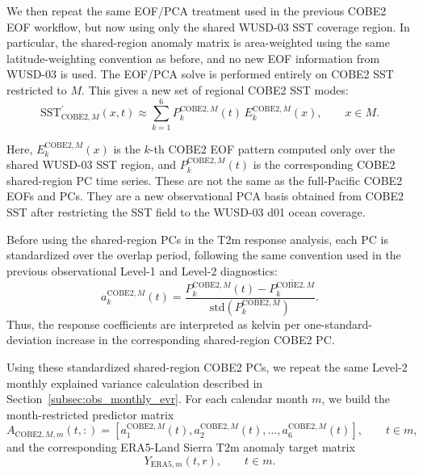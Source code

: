 \documentclass[11pt]{article}
\newcommand{\sst}{\mathrm{SST}}
\begin{document}
We then repeat the same EOF/PCA treatment used in the previous COBE2 EOF workflow, but now using
only the shared WUSD-03 SST coverage region. In particular, the shared-region anomaly matrix is
area-weighted using the same latitude-weighting convention as before, and no new EOF information
from WUSD-03 is used. The EOF/PCA solve is performed entirely on COBE2 SST restricted to $M$. This
gives a new set of regional COBE2 SST modes:
\begin{equation}
\sst_{\mathrm{COBE2},M}^{\prime}(x,t)
\approx
\sum_{k=1}^{6}
P^{\mathrm{COBE2},M}_{k}(t)\,E^{\mathrm{COBE2},M}_{k}(x),
\qquad x \in M.
\label{eq:cobe2_sharedregion_eof_expansion}
\end{equation}

Here, $E^{\mathrm{COBE2},M}_{k}(x)$ is the $k$-th COBE2 EOF pattern computed only over the
shared WUSD-03 SST region, and $P^{\mathrm{COBE2},M}_{k}(t)$ is the corresponding COBE2
shared-region PC time series. These are not the same as the full-Pacific COBE2 EOFs and PCs. They
are a new observational PCA basis obtained from COBE2 SST after restricting the SST field to the
WUSD-03 d01 ocean coverage.

Before using the shared-region PCs in the T2m response analysis, each PC is standardized over the
overlap period, following the same convention used in the previous observational Level-1 and
Level-2 diagnostics:
\begin{equation}
a^{\mathrm{COBE2},M}_{k}(t)
=
\frac{
P^{\mathrm{COBE2},M}_{k}(t) - \overline{P^{\mathrm{COBE2},M}_{k}}
}{
\mathrm{std}\!\left(P^{\mathrm{COBE2},M}_{k}\right)
}.
\label{eq:cobe2_sharedregion_pc_standardization}
\end{equation}
Thus, the response coefficients are interpreted as kelvin per one-standard-deviation increase in
the corresponding shared-region COBE2 PC.

Using these standardized shared-region COBE2 PCs, we repeat the same Level-2 monthly explained
variance calculation described in Section~\ref{subsec:obs_monthly_evr}. For each calendar month
$m$, we build the month-restricted predictor matrix
\begin{equation}
A_{\mathrm{COBE2},M,m}(t,:)
=
\left[
a^{\mathrm{COBE2},M}_{1}(t),
a^{\mathrm{COBE2},M}_{2}(t),
\dots,
a^{\mathrm{COBE2},M}_{6}(t)
\right],
\qquad t \in m,
\end{equation}
and the corresponding ERA5-Land Sierra T2m anomaly target matrix
\begin{equation}
Y_{\mathrm{ERA5},m}(t,r),
\qquad t \in m.
\end{equation}
\end{document}

